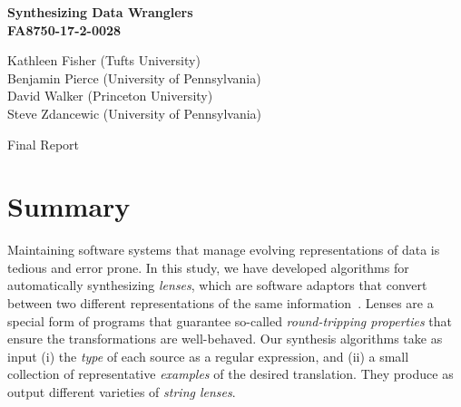 \documentclass[12pt]{article}
\begin{document}
\pagestyle{empty}

\begin{center}

  \vspace{1in}

  \Large \textbf{Synthesizing Data Wranglers\\\vspace{1cm} FA8750-17-2-0028}

  \vspace{1in}

  \large
  Kathleen Fisher (Tufts University) \\
  Benjamin Pierce  (University of Pennsylvania) \\
  David Walker (Princeton University) \\
  Steve Zdancewic (University of Pennsylvania)
  \vspace{1in}

  Final Report

\end{center}

\newpage
\pagestyle{plain}

\renewcommand{\thepage}{\roman{page}}%
\setcounter{page}{1}%

\tableofcontents
\newpage

\listoffigures
\newpage

\renewcommand{\thepage}{\arabic{page}}%
\setcounter{page}{1}%

\section{Summary}

Maintaining software systems that manage evolving representations of
data is tedious and error prone.  In this study, we have developed
algorithms for automatically synthesizing \emph{lenses}, which are
software adaptors that convert between two different representations
of the same information~\cite{Focal2005}.  Lenses are a special form of
programs that 
guarantee so-called \emph{round-tripping properties} that ensure the
transformations are well-behaved.  Our synthesis algorithms take as
input (i) the \emph{type} of each source as a regular expression, and
(ii) a small collection of representative \emph{examples} of
the desired translation.  They produce as output different varieties of \emph{string
  lenses}.
\end{document}
